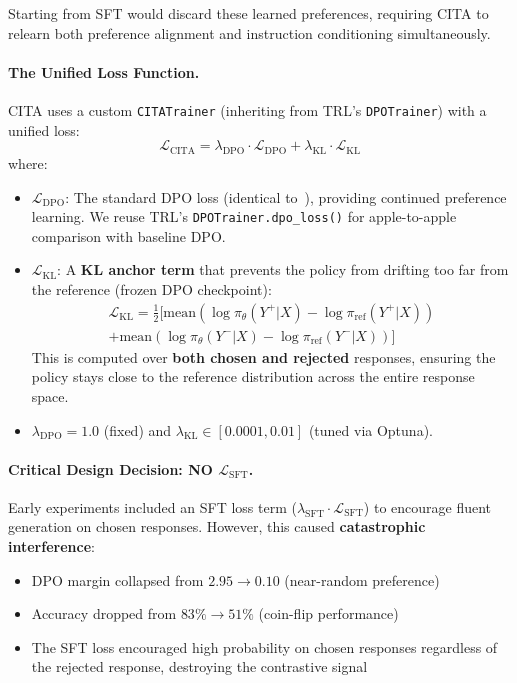 Starting from SFT would discard these learned preferences, requiring CITA to relearn both preference alignment and instruction conditioning simultaneously.

\paragraph{The Unified Loss Function.} CITA uses a custom \texttt{CITATrainer} (inheriting from TRL's \texttt{DPOTrainer}) with a unified loss:
\begin{equation*}
    \mathcal{L}_{\text{CITA}} = \lambda_{\text{DPO}} \cdot \mathcal{L}_{\text{DPO}} + \lambda_{\text{KL}} \cdot \mathcal{L}_{\text{KL}}
\end{equation*}
where:
\begin{itemize}[leftmargin=*]
    \item $\mathcal{L}_{\text{DPO}}$: The standard DPO loss (identical to~\cite{rafailov2023direct}), providing continued preference learning. We reuse TRL's \texttt{DPOTrainer.dpo\_loss()} for apple-to-apple comparison with baseline DPO.

    \item $\mathcal{L}_{\text{KL}}$: A \textbf{KL anchor term} that prevents the policy from drifting too far from the reference (frozen DPO checkpoint):
    {\small
    \begin{multline*}
        \mathcal{L}_{\text{KL}} = \frac{1}{2} \Big[ \text{mean}\!\left(\log \pi_\theta(Y^+ | X) - \log \pi_{\text{ref}}(Y^+ | X)\right) \\
        + \text{mean}\!\left(\log \pi_\theta(Y^- | X) - \log \pi_{\text{ref}}(Y^- | X)\right) \Big]
    \end{multline*}
    }
    This is computed over \textbf{both chosen and rejected} responses, ensuring the policy stays close to the reference distribution across the entire response space.

    \item $\lambda_{\text{DPO}} = 1.0$ (fixed) and $\lambda_{\text{KL}} \in [0.0001, 0.01]$ (tuned via Optuna).
\end{itemize}

\paragraph{Critical Design Decision: NO $\mathcal{L}_{\text{SFT}}$.} Early experiments included an SFT loss term ($\lambda_{\text{SFT}} \cdot \mathcal{L}_{\text{SFT}}$) to encourage fluent generation on chosen responses. However, this caused \textbf{catastrophic interference}:
\begin{itemize}[leftmargin=*]
    \item DPO margin collapsed from $2.95 \rightarrow 0.10$ (near-random preference)
    \item Accuracy dropped from $83\% \rightarrow 51\%$ (coin-flip performance)
    \item The SFT loss encouraged high probability on chosen responses regardless of the rejected response, destroying the contrastive signal
\end{itemize}

